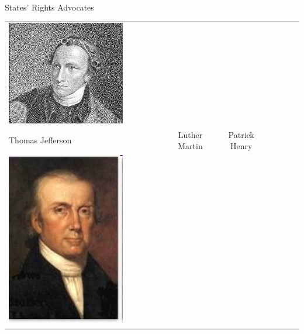 \begin{frame}{States' Rights Advocates}
\begin{table}[h]
\begin{tabular}{lcccccc}
    \includegraphics[width=0.75\textwidth,height=.3\textheight,keepaspectratio=true]{img/patrick-henry.png} \\
    Thomas Jefferson &
    Luther Martin &
    Patrick Henry \\
    \includegraphics[width=0.75\textwidth,height=.3\textheight,keepaspectratio=true]{img/john-taylor-of-caroline.png} &

\end{tabular}
\end{table}
\end{frame}
